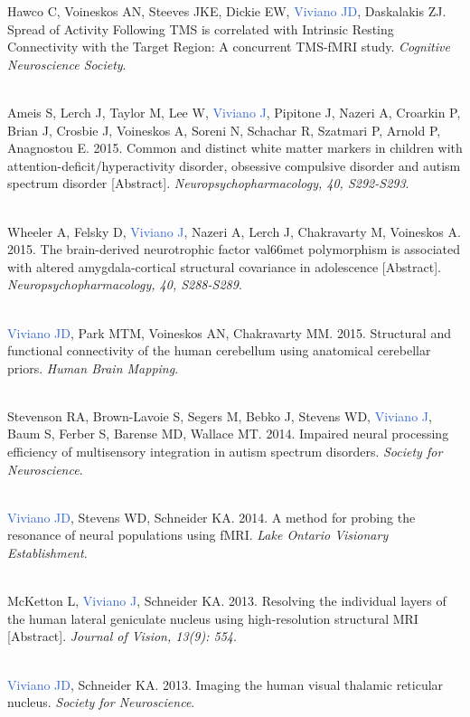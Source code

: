 \documentclass[a4paper,11pt,oneside]{book}
\begin{document}
\begin{flushleft}
Hawco C, Voineskos AN, Steeves JKE, Dickie EW, \textcolor{highlight}{Viviano JD}, Daskalakis ZJ. Spread of Activity Following TMS is correlated with Intrinsic Resting Connectivity with the Target Region: A concurrent TMS-fMRI study. \textit{Cognitive Neuroscience Society}. \\\

Ameis S, Lerch J, Taylor M, Lee W, \textcolor{highlight}{Viviano J}, Pipitone J, Nazeri A, Croarkin P, Brian J, Crosbie J, Voineskos A, Soreni N, Schachar R, Szatmari P, Arnold P, Anagnostou E. 2015. Common and distinct white matter markers in children with attention-deficit/hyperactivity disorder, obsessive compulsive disorder and autism spectrum disorder [Abstract]. \textit{Neuropsychopharmacology, 40, S292-S293}. \\\

Wheeler A, Felsky D, \textcolor{highlight}{Viviano J}, Nazeri A, Lerch J, Chakravarty M, Voineskos A. 2015. The brain-derived neurotrophic factor val66met polymorphism is associated with altered amygdala-cortical structural covariance in adolescence [Abstract]. \textit{Neuropsychopharmacology, 40, S288-S289}. \\\

\textcolor{highlight}{Viviano JD}, Park MTM, Voineskos AN, Chakravarty MM. 2015. Structural and functional connectivity of the human cerebellum using anatomical cerebellar priors. \textit{Human Brain Mapping}. \\\

Stevenson RA, Brown-Lavoie S, Segers M, Bebko J, Stevens WD, \textcolor{highlight}{Viviano J}, Baum S, Ferber S, Barense MD, Wallace MT. 2014. Impaired neural processing efficiency of multisensory integration in autism spectrum disorders. \textit{Society for Neuroscience}. \\\

\textcolor{highlight}{Viviano JD}, Stevens WD, Schneider KA. 2014. A method for probing the resonance of neural populations using fMRI. \textit{Lake Ontario Visionary Establishment}. \\\

McKetton L, \textcolor{highlight}{Viviano J}, Schneider KA. 2013. Resolving the individual layers of the human lateral geniculate nucleus using high-resolution structural MRI [Abstract]. \textit{Journal of Vision, 13(9): 554}. \\\

\textcolor{highlight}{Viviano JD}, Schneider KA. 2013. Imaging the human visual thalamic reticular nucleus. \textit{Society for Neuroscience}. \\\


\end{flushleft}
\end{document}
